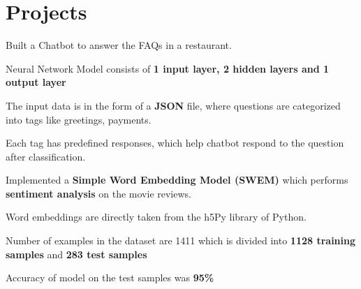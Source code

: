 \documentclass[]{resume-openfont}
\begin{document}
\section{Projects}

\begin{tightemize}
    \item Built a Chatbot to answer the FAQs in a restaurant.
    \item Neural Network Model consists of \textbf{1 input layer, 2 hidden layers and 1 output layer}
    \item The input data is in the form of a \textbf{JSON} file, where questions are categorized into tags like greetings, payments.
    \item Each tag has predefined responses, which help chatbot respond to the question after classification.
\end{tightemize}
\sectionsep
%
  
\begin{tightemize}
    \item Implemented a \textbf{Simple Word Embedding Model (SWEM)} which performs \textbf{sentiment analysis} on the movie reviews.
    \item Word embeddings are directly taken from the h5Py library of Python.
    \item Number of examples in the dataset are 1411 which is divided into \textbf{1128 training samples} and  \textbf{283 test samples}
    \item Accuracy of model on the test samples was \textbf{95\%}
\end{tightemize}
\sectionsep
\end{document}
